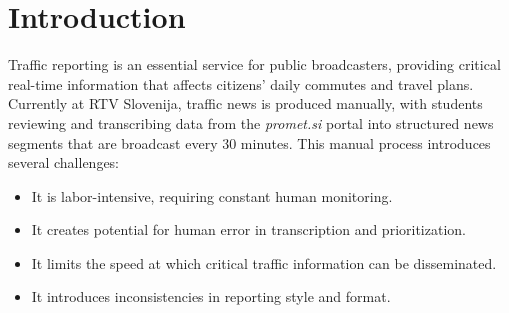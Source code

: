 \documentclass[fleqn,moreauthors,10pt]{ds_report}
\affiliation{\textit{Advisors: Slavko Žitnik}}
\begin{document}
\flushbottom

\maketitle

\thispagestyle{empty}


\section*{Introduction}

Traffic reporting is an essential service for public broadcasters, providing critical real-time information that affects citizens' daily commutes and travel plans. Currently at RTV Slovenija, traffic news is produced manually, with students reviewing and transcribing data from the \textit{promet.si} portal into structured news segments that are broadcast every 30 minutes. This manual process introduces several challenges:

\begin{itemize}[label=$\bullet$]
    \item It is labor-intensive, requiring constant human monitoring.
    \item It creates potential for human error in transcription and prioritization.
    \item It limits the speed at which critical traffic information can be disseminated.
    \item It introduces inconsistencies in reporting style and format.
\end{itemize}
\end{document}
